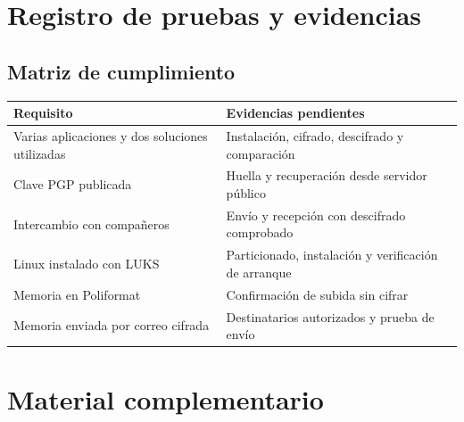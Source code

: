 \chapter{Registro de pruebas y evidencias}
\section{Matriz de cumplimiento}
\begingroup\small
\noindent\begin{tabularx}{\textwidth}{>{\raggedright\arraybackslash}p{}>{\raggedright\arraybackslash}X}
\toprule
Requisito & Evidencias pendientes\\
\midrule
Varias aplicaciones y dos soluciones utilizadas & Instalación, cifrado, descifrado y comparación\\
Clave PGP publicada & Huella y recuperación desde servidor público\\
Intercambio con compañeros & Envío y recepción con descifrado comprobado\\
Linux instalado con LUKS & Particionado, instalación y verificación de arranque\\
Memoria en Poliformat & Confirmación de subida sin cifrar\\
Memoria enviada por correo cifrada & Destinatarios autorizados y prueba de envío\\
\bottomrule
\end{tabularx}
\endgroup
\chapter{Material complementario}
